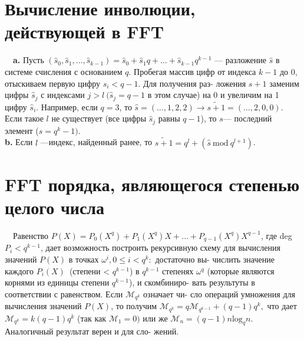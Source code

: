 \documentclass{mai_book}
\begin{document}
\section{Вычисление инволюции, действующей в F{\footnotesize FT}}
\indent~~\textbf{a.} Пусть $(\hat{s}_0,\hat{s}_1,\ldots,\hat{s}_{k-1})=\hat{s}_0+\hat{s}_1q+\ldots+\hat{s}_{k-1}q^{k-1}$ --- разложение $\hat{s}$\linebreak
в системе счисления с основанием $q$. Пробегая массив цифр от индекса\linebreak
$k-1$ до $0$, отыскиваем первую цифру $\hat{s}_i<q-1.$ Для получения раз-\linebreak
ложения $s+1$ заменим цифры $\hat{s}_j$ с индексами $j>l~(\hat{s}_j=q-1$ в\linebreak 
\newpage
\noindent этом случае) на 0 и увеличим на 1 цифру $\hat{s}_i$. Например, если $q=3$,\linebreak
то $\hat{s}=(\ldots,1,2,2)\rightarrow\widetilde{s+1}=(\ldots,2,0,0).$ Если такое $l$ не существует\linebreak
(все цифры $\hat{s}_j$ равны $q-1$), то $s$--- последний элемент ($s=q^k-1)$. \\
\indent\textbf{b.} Если $l$ ---индекс, найденный ранее, то $\widetilde{s+1}=q^l+(\hat{s}~\text{mod}~q^{l+1})$.
\section{ F{\footnotesize FT} порядка, являющегося степенью целого числа}
\indent~~Равенство $P(X)=P_0(X^q)+P_1(X^q)X+\ldots+P_{q-1}(X^q)X^{q-1}$, где\linebreak
deg~$P_i<q^{k-1}$, дает возможность построить рекурсивную схему для\linebreak
вычисления значений $P(X)$ в точках $\omega^i,0\leq i<q^k:$ достаточно вы-\linebreak
числить значение каждого $P_i(X)$~(степени < $q^{k-1}$) в $q^{k-1}$ степенях $\omega^q$\linebreak
(которые являются корнями из единицы степени $q^{k-1}$), и скомбиниро-\linebreak
вать результуты в соответствии с равенством. Если $\mathcal{M}_{q^k}$ означает чи-\linebreak
сло операций умножения для вычисления значений $P(X)$, то получим\linebreak
$\mathcal{M}_{q^k}=q\mathcal{M}_{q^{k-1}}+(q-1)q^k,$ что дает $\mathcal{M}_{q^k}=k(q-1)q^k$ (так как $\mathcal{M}_1=0)$\linebreak
или же $\mathcal{M}_n=(q-1)n\text{log}_qn.$ Аналогичный результат верен и для сло-\linebreak
жений.
\end{document}
